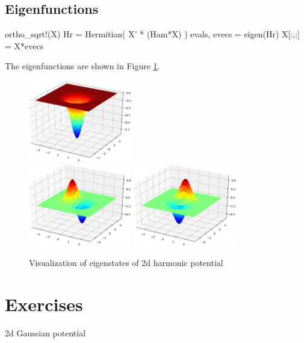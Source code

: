 \subsection{Eigenfunctions}

\begin{juliacode}
ortho_sqrt!(X)
Hr = Hermitian( X' * (Ham*X) )
evals, evecs = eigen(Hr)
X[:,:] = X*evecs
\end{juliacode}

The eigenfunctions are shown in Figure \ref{fig:harm_2d_eigenfunctions}.

\begin{figure}[h]
{\centering
\includegraphics[width=0.4\textwidth]{../codes/sch_2d/IMG_harmonic_psi_1.pdf}\\
\includegraphics[width=0.4\textwidth]{../codes/sch_2d/IMG_harmonic_psi_2.pdf}%
\includegraphics[width=0.4\textwidth]{../codes/sch_2d/IMG_harmonic_psi_3.pdf}
\par}
\caption{Visualization of eigenstates of 2d harmonic potential}
\label{fig:harm_2d_eigenfunctions}
\end{figure}

\section{Exercises}

2d Gaussian potential